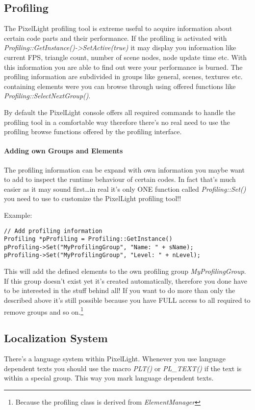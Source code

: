 \subsection{Profiling}
The PixelLight profiling tool is extreme useful to acquire information about certain code parts and their performance. If the profiling is activated with \emph{Profiling::GetInstance()->SetActive(true)} it may display you information like current FPS, triangle count, number of scene nodes, node update time etc. With this information you are able to find out were your performance is burned. The profiling information are subdivided in groups like general, scenes, textures etc. containing elements were you can browse through using offered functions like \emph{Profiling::SelectNextGroup()}.

By default the PixelLight console offers all required commands to handle the profiling tool in a comfortable way therefore there's no real need to use the profiling browse functions offered by the profiling interface.


\paragraph{Adding own Groups and Elements}
The profiling information can be expand with own information you maybe want to add to inspect the runtime behaviour of certain codes. In fact that's much easier as it may sound first\ldots in real it's only ONE function called \emph{Profiling::Set()} you need to use to customize the PixelLight profiling tool!!

Example:

\begin{lstlisting}[caption=Profiling usage example]
// Add profiling information
Profiling *pProfiling = Profiling::GetInstance()
pProfiling->Set("MyProfilingGroup", "Name: " + sName);
pProfiling->Set("MyProfilingGroup", "Level: " + nLevel);
\end{lstlisting}

This will add the defined elements to the own profiling group \emph{MyProfilingGroup}. If this group doesn't exist yet it's created automatically, therefore you done have to be interested in the stuff behind all! If you want to do more than only the described above it's still possible because you have FULL access to all required to remove groups and so on.\footnote{Because the profiling class is derived from \emph{ElementManager}}




\subsection{Localization System}
There's a language system within PixelLight. Whenever you use language dependent texts you should use the macro \emph{PLT()} or \emph{PL\_TEXT()} if the text is within a special group. This way you mark language dependent texts.

